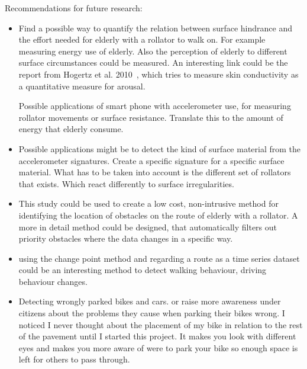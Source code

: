 Recommendations for future research:
\begin{itemize}
\item Find a possible way to quantify the relation between surface hindrance and the effort needed for elderly with a rollator to walk on. For example measuring energy use of elderly. Also the perception of elderly to different surface circumstances could be measured. An interesting link could be the report from Hogertz et al. 2010~\cite{Sauter2010}, which tries to measure skin conductivity as a quantitative measure for arousal. 


Possible applications of smart phone with accelerometer use, for measuring rollator movements or surface resistance. Translate this to the amount of energy that elderly consume. 

\item Possible applications might be to detect the kind of surface material from the accelerometer signatures. Create a specific signature for a specific surface material. What has to be taken into account is the different set of rollators that exists. Which react differently to surface irregularities.

\item This study could be used to create a low cost, non-intrusive method for identifying the location of obstacles on the route of elderly with a rollator. A more in detail method could be designed, that automatically filters out priority obstacles where the data changes in a specific way. 

\item using the change point method and regarding a route as a time series dataset could be an interesting method to detect walking behaviour, driving behaviour changes. 

\item Detecting wrongly parked bikes and cars. or raise more awareness under citizens about the problems they cause when parking their bikes wrong. I noticed I never thought about the placement of my bike in relation to the rest of the pavement until I started this project. It makes you look with different eyes and makes you more aware of were to park your bike so enough space is left for others to pass through.  

\end{itemize}






